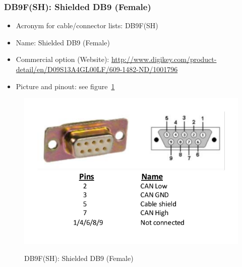 \subsubsection{DB9F(SH): Shielded DB9 (Female)} \label{DEVICE:DB9F(SH)}
\begin{itemize}
  \item Acronym for cable/connector lists: DB9F(SH)
  \item Name: Shielded DB9 (Female)
  \item Commercial option (Website): \href{http://www.digikey.com/product-detail/en/D09S13A4GL00LF/609-1482-ND/1001796}{http://www.digikey.com/product-detail/en/D09S13A4GL00LF/609-1482-ND/1001796}
  \item Picture and pinout: see figure~\ref{FIG:DEVICEDB9F(SH)}
\end{itemize}
\begin{figure}
  \centering
  \includegraphics[angle=90,width=1\columnwidth]{figs/body02/FIGDEVICEDB9F(SH).pdf}\\
  \caption[DB9F(SH): Shielded DB9 (Female)]{DB9F(SH): Shielded DB9 (Female)}
  \label{FIG:DEVICEDB9F(SH)}
\end{figure}
